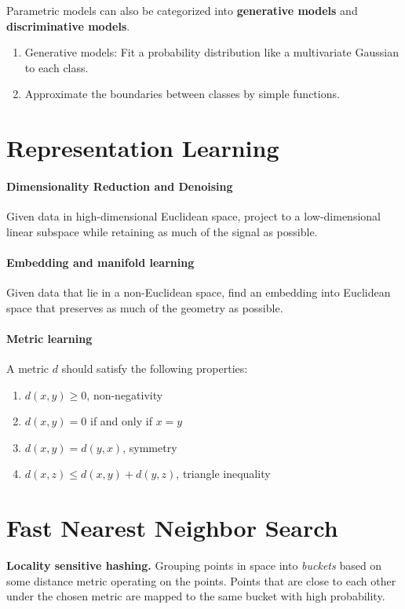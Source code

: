 Parametric models can also be categorized into \textbf{generative models} and 
\textbf{discriminative models}.
\begin{enumerate}
\item Generative models: Fit a probability distribution like a multivariate Gaussian to each class.
\item Approximate the boundaries between classes by simple functions.
\end{enumerate}

\section{Representation Learning}


\paragraph{Dimensionality Reduction and Denoising}
Given data in high-dimensional Euclidean space, project to a
low-dimensional linear subspace while retaining as much of the
signal as possible. 

\paragraph{Embedding and manifold learning}
Given data that lie in a non-Euclidean space, find an embedding into
Euclidean space that preserves as much of the geometry as possible.

\paragraph{Metric learning}
A metric $d$ should satisfy the following properties:
\begin{enumerate}
	\item $d(x, y) \geq 0$, non-negativity
	\item $d(x, y) = 0$ if and only if $x = y$
	\item $d(x, y) = d(y, x)$, symmetry
	\item $d(x, z) \leq d(x, y) + d(y, z)$, triangle inequality
\end{enumerate}

\section{Fast Nearest Neighbor Search}
\textbf{Locality sensitive hashing.}\hspace{0.2cm} Grouping points in space into \textit{buckets} based on some distance metric operating on the points. Points that are close to each other under the chosen metric are mapped to the same bucket with high probability.

